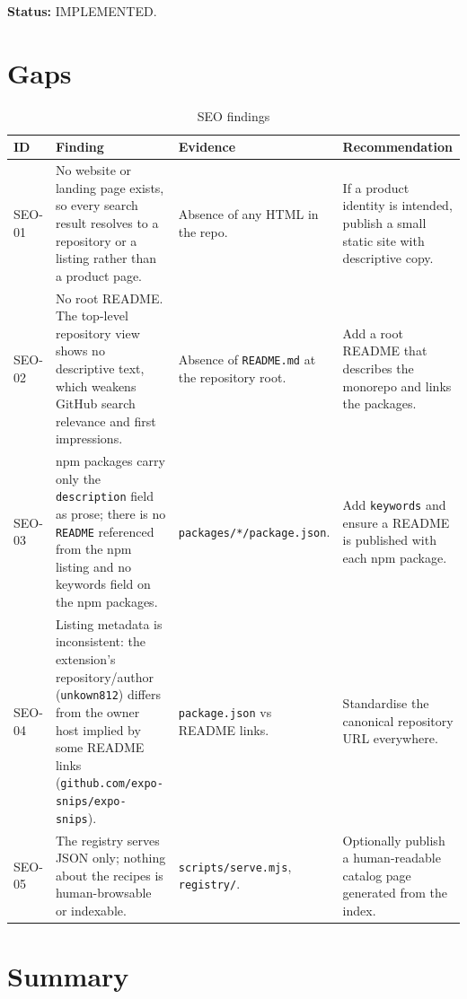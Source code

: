 \textbf{Status:} IMPLEMENTED.

\section{Gaps}

\begin{longtable}{p{1.5cm}p{4.6cm}p{3.4cm}p{4.7cm}}
\caption{SEO findings}\\
\toprule
\textbf{ID} & \textbf{Finding} & \textbf{Evidence} & \textbf{Recommendation} \\
\midrule

SEO-01 & No website or landing page exists, so every search result resolves to a
repository or a listing rather than a product page. & Absence of any HTML in the
repo. & If a product identity is intended, publish a small static site with
descriptive copy. \\
SEO-02 & No root README. The top-level repository view shows no descriptive text,
which weakens GitHub search relevance and first impressions. & Absence of
\texttt{README.md} at the repository root. & Add a root README that describes the
monorepo and links the packages. \\
SEO-03 & npm packages carry only the \texttt{description} field as prose; there is
no \texttt{README} referenced from the npm listing and no keywords field on the
npm packages. & \texttt{packages/*/package.json}. & Add \texttt{keywords} and
ensure a README is published with each npm package. \\
SEO-04 & Listing metadata is inconsistent: the extension's repository/author
(\texttt{unkown812}) differs from the owner host implied by some README links
(\texttt{github.com/expo-snips/expo-snips}). & \texttt{package.json} vs README
links. & Standardise the canonical repository URL everywhere. \\
SEO-05 & The registry serves JSON only; nothing about the recipes is
human-browsable or indexable. & \texttt{scripts/serve.mjs}, \texttt{registry/}. &
Optionally publish a human-readable catalog page generated from the index. \\
\bottomrule
\end{longtable}

\section{Summary}

